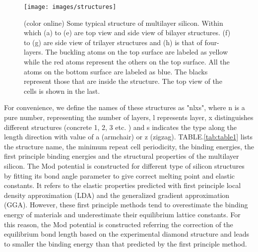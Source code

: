 \documentclass[%
 reprint,
 amsmath,amssymb,
 aps,
 prb,
]{revtex4-1}
\begin{document}
\begin{figure}[b]
  \texttt{[image: images/structures]}
  \caption{\label{fig:structures}  (color online) Some typical structure of multilayer silicon. Within which (a) to (e) are top view and side view of bilayer structures. (f) to (g) are side view of trilayer structures and (h) is that of four-layers. The buckling atoms on the top surface are labeled as yellow while the red atoms represent the others on the top surface. All the atoms on the bottom surface are labeled as blue. The blacks represent those that are inside the structure. The top view of the cells is shown in the last.}
\end{figure}

For convenience, we define the names of these structures as "nlxs", where n is a pure number, representing the number of layers, l represents layer, x distinguishes different structures (concrete 1, 2, 3 etc. ) and s indicates the type along the length direction with value of a (armchair) or z (zigzag). TABLE.\ref{tab:table1} lists the structure name, the minimum repeat cell periodicity, the binding energies, the first principle binding energies and the structural properties of the multilayer silicon. The Mod potential is constructed for different type of silicon structures by fitting its bond angle parameter to give correct melting point and elastic constants. It refers to the elastic properties predicted with first principle local density approximation (LDA) and the generalized gradient approximation (GGA). However, these first principle methods tend to overestimate the binding energy of materials and underestimate their equilibrium lattice constants. For this reason, the Mod potential is constructed referring the correction of the equilibrium bond length based on the experimental diamond structure and leads to smaller the binding energy than that predicted by the first principle method.
\end{document}
